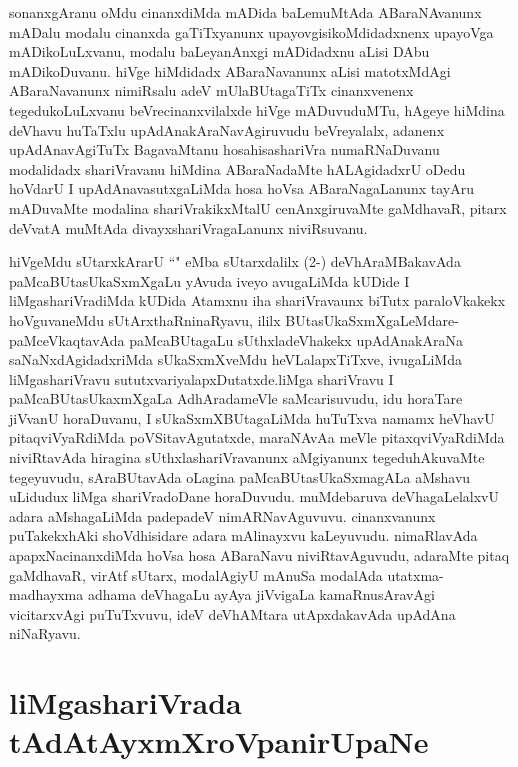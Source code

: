 \begin{artha}
sonanxgAranu oMdu cinanxdiMda mADida baLemuMtAda ABaraNAvanunx mADalu modalu cinanxda gaTiTxyanunx upayovgisikoMdidadxnenx upayoVga mADikoLuLxvanu, modalu baLeyanAnxgi mADidadxnu aLisi DAbu mADikoDuvanu. hiVge hiMdidadx ABaraNavanunx aLisi matotxMdAgi ABaraNavanunx nimiRsalu adeV mUlaBUtagaTiTx cinanxvenenx tegedukoLuLxvanu beVrecinanxvilalxde hiVge mADuvuduMTu, hAgeye hiMdina deVhavu huTaTxlu upAdAnakAraNavAgiruvudu beVreyalalx, adanenx upAdAnavAgiTuTx BagavaMtanu hosahisashariVra numaRNaDuvanu modalidadx shariVravanu hiMdina ABaraNadaMte hALAgidadxrU oDedu hoVdarU I upAdAnavasutxgaLiMda hosa hoVsa ABaraNagaLanunx tayAru mADuvaMte modalina shariVrakikxMtalU cenAnxgiruvaMte gaMdhavaR, pitarx deVvatA muMtAda divayxshariVragaLanunx niviRsuvanu. 

hiVgeMdu sUtarxkArarU ``\stext" eMba sUtarxdalilx (2-) deVhAraMBakavAda paMcaBUtasUkaSxmXgaLu yAvuda iveyo avugaLiMda kUDide I liMgashariVradiMda kUDida Atamxnu iha shariVravaunx biTutx paraloVkakekx hoVguvaneMdu sUtArxthaRninaRyavu, ililx BUtasUkaSxmXgaLeMdare- paMceVkaqtavAda paMcaBUtagaLu sUthxladeVhakekx upAdAnakAraNa saNaNxdAgidadxriMda sUkaSxmXveMdu heVLalapxTiTxve, ivugaLiMda liMgashariVravu sututxvariyalapxDutatxde.liMga shariVravu I paMcaBUtasUkaxmXgaLa AdhAradameVle saMcarisuvudu, idu horaTare jiVvanU horaDuvanu, I sUkaSxmXBUtagaLiMda huTuTxva namamx heVhavU pitaqviVyaRdiMda poVSitavAgutatxde, maraNAvAa meVle pitaxqviVyaRdiMda niviRtavAda hiragina sUthxlashariVravanunx aMgiyanunx tegeduhAkuvaMte tegeyuvudu, sAraBUtavAda oLagina paMcaBUtasUkaSxmagALa aMshavu uLidudux liMga shariVradoDane horaDuvudu. muMdebaruva deVhagaLelalxvU adara aMshagaLiMda padepadeV nimARNavAguvuvu. cinanxvanunx puTakekxhAki shoVdhisidare adara mAlinayxvu kaLeyuvudu. nimaRlavAda apapxNacinanxdiMda hoVsa hosa ABaraNavu niviRtavAguvudu, adaraMte pitaq gaMdhavaR, virAtf sUtarx, modalAgiyU mAnuSa modalAda utatxma-madhayxma adhama deVhagaLu ayAya jiVvigaLa kamaRnusAravAgi vicitarxvAgi puTuTxvuvu, ideV deVhAMtara utApxdakavAda upAdAna niNaRyavu.
\end{artha}

\section*{liMgashariVrada tAdAtAyxmXroVpanirUpaNe}

